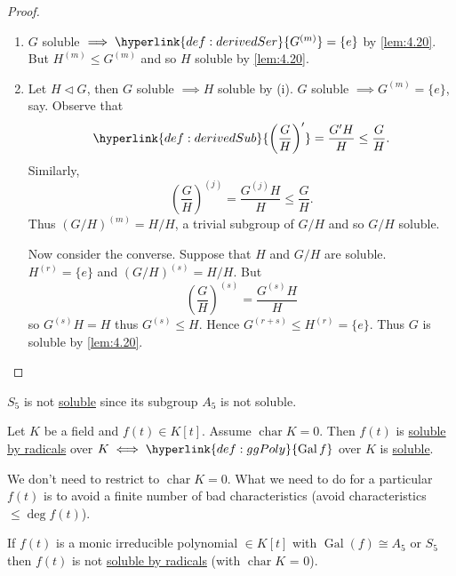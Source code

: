 \documentclass{article}
\DeclareMathOperator{\chara}{char}
\DeclareMathOperator{\Gal}{Gal}
\begin{document}
\begin{proof}\leavevmode
    \begin{enumerate}[label=(\roman*)]
        \item $G$ soluble $\implies \hyperlink{def:derivedSer}{G^{(m)}} = \{e\}$ by \cref{lem:4.20}.
            But $H^{(m)} \leq G^{(m)}$ and so $H$ soluble by \cref{lem:4.20}.
        \item Let $H \lhd G$, then $G$ soluble $\implies H$ soluble by (i).
            $G$ soluble $\implies G^{(m)} = \{e\}$, say.
            Observe that
            \begin{equation*}\hyperlink{def:derivedSub}{\left(\frac{G}{H}\right)'} = \frac{G'H}{H} \leq \frac{G}{H}.\end{equation*}
            Similarly,
            \begin{equation*}
                (\frac{G}{H})^{(j)} = \frac{G^{(j)}H}{H} \leq \frac{G}{H}.
            \end{equation*}
            Thus $(G/H)^{(m)} = H/H$, a trivial subgroup of $G/H$ and so $G/H$ soluble.

            Now consider the converse. Suppose that $H$ and $G/H$ are soluble.
            $H^({r}) = \{e\}$ and $(G/H)^{(s)} = H/H$.
            But
            \begin{equation*}
                \left(\frac{G}{H}\right)^{(s)} = \frac{G^{(s)}H}{H}
            \end{equation*}
            so $G^{(s)}H = H$ thus $G^{(s)} \leq H$. Hence $G^{(r+s)} \leq H^{(r)} = \{e\}$.
            Thus $G$ is soluble by \cref{lem:4.20}.
    \end{enumerate}
\end{proof}
\begin{eg}
    $S_5$ is not \hyperlink{def:soluble}{soluble} since its subgroup $A_5$ is not soluble.
\end{eg}
\begin{nthm}\label{thm:4.22}
    Let $K$ be a field and $f(t) \in K[t]$.
    Assume $\chara K= 0$. Then $f(t)$ is \hyperlink{def:radicals}{soluble by radicals} over $K \iff \hyperlink{def:ggPoly}{\Gal f}$ over $K$ is \hyperlink{def:soluble}{soluble}.
\end{nthm}
\begin{remark}
    We don't need to restrict to $\chara K = 0$. What we need to do for a particular $f(t)$ is to avoid a finite number of bad characteristics (avoid characteristics $\leq \deg f(t)$).
\end{remark}
\begin{ncor}\label{cor:4.23}
    If $f(t)$ is a monic irreducible polynomial $\in K[t]$ with $\Gal(f) \cong A_5$ or $S_5$ then $f(t)$ is not \hyperlink{def:radicals}{soluble by radicals} (with $\chara K$ = 0).
\end{ncor}
\end{document}
